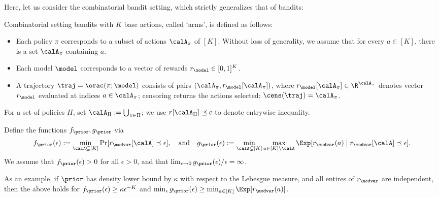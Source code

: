 Here, let us consider the combinatorial bandit setting, which strictly generalizes that of bandits:
\begin{setting}
Combinatorial setting bandits with $K$ base actions, called `arms', is defined as follows:
\begin{itemize}
	\item Each policy $\pi$ corresponds to a subset of actions $\calA_{\pi}$ of $[K]$. Without loss of generality, we assume that for every $a \in [K]$, there is a set $\calA_{\pi} $ containing $a$.
	\item Each model $\model$ corresponds to a vector of rewards $r_{\model} \in [0,1]^K$.
	\item A trajectory $\traj = \orac(\pi;\model)$ consists of pairs $(\calA_{\pi},r_{\model}[\calA_{\pi}])$, where $r_{\model}[\calA_{\pi}] \in \R^{\calA_{\pi}}$ denotes vector $r_\model$ evaluated at indices $a \in \calA_{\pi}$; censoring returns  the actions selected: $\cens(\traj) = \calA_{\pi}$. 
\end{itemize}
For a set of policies $\Pi$, set $\calA_{\Pi} := \bigcup_{\pi \in \Pi}$; we use $r[\calA_{\Pi}] \preceq c$ to denote entrywise inequality. 
\end{setting}
\newcommand{\fprior}{f_{\prior}}
\newcommand{\gprior}{g_{\prior}}


\begin{condition}\label{cond:bandits_two} Define the functions $f_{\prior},g_{\prior}$ via
\begin{align*}
f_{\prior}(\epsilon) := \min_{\calA \subsetneq [K]}\Pr[r_{\modvar}[\calA] \preceq \epsilon], \quad \text{and} \quad g_{\prior}(\epsilon) := \min_{\calA \subsetneq [K]} \max_{a \in [K]\setminus \calA} \Exp[r_{\modvar}(a) \mid r_{\modvar}[\calA] \preceq \epsilon].
\end{align*}
We assume that $\fprior(\epsilon) > 0$ for all $\epsilon > 0$, and that $\lim_{\epsilon \to 0} \gprior(\epsilon)/\epsilon = \infty$.
\end{condition}
As an example, if $\prior$ has density lower bound by $\kappa$ with respect to the Lebesgue measure, and all entires of $r_{\modvar}$ are independent, then the above holds for $\fprior(\epsilon) \ge \kappa \epsilon^{-K}$ and $\min_{\epsilon} \gprior(\epsilon) \ge \min_{a \in [K]} \Exp[ r_{\modvar}(a)]$. 

